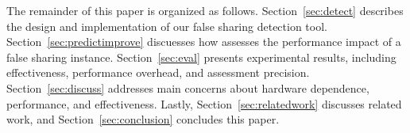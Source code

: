 
The remainder of this paper is organized as follows. 
Section~\ref{sec:detect} describes the design and implementation of our false sharing detection tool. Section~\ref{sec:predictimprove} discuesses how \cheetah{} assesses the performance impact of a false sharing instance. Section~\ref{sec:eval} presents experimental results, including effectiveness, performance overhead, and assessment precision. Section~\ref{sec:discuss} addresses main concerns about hardware dependence, performance, and effectiveness. Lastly, Section~\ref{sec:relatedwork} discusses related work, and Section~\ref{sec:conclusion} concludes this paper. 



